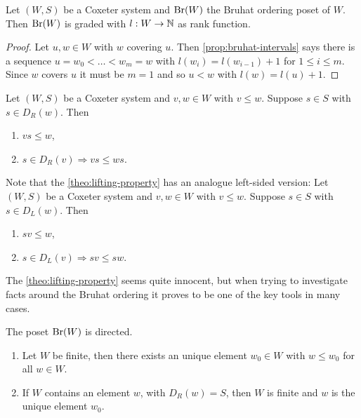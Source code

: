 \begin{coro}
	Let $(W,S)$ be a Coxeter system and $\operatorname{Br}(W)$ the Bruhat ordering poset of $W$. Then $\operatorname{Br}(W)$ is graded with $l:W \to \mathbb{N}$ as rank function.

	\begin{proof}
		Let $u,w \in W$ with $w$ covering $u$. Then \ref{prop:bruhat-intervals} says there is a sequence $u = w_0 < \ldots < w_m = w$ with $l(w_i) = l(w_{i-1}) + 1$ for $1 \leq i \leq m$. Since $w$ covers $u$ it must be $m = 1$ and so $u < w$ with $l(w) = l(u) + 1$.
	\end{proof}
\end{coro}

\begin{theo}
	Let $(W,S)$ be a Coxeter system and $v,w \in W$ with $v \leq w$. Suppose $s \in S$ with $s \in D_R(w)$. Then
	\begin{enumerate}
		\item $vs \leq w$,
		\item $s \in D_R(v) \Rightarrow vs \leq ws$.
	\end{enumerate}
\end{theo}

\begin{rema}
	Note that the \ref{theo:lifting-property} has an analogue left-sided version: Let $(W,S)$ be a Coxeter system and $v,w \in W$ with $v \leq w$. Suppose $s \in S$ with $s \in D_L(w)$. Then
	\begin{enumerate}
		\item $sv \leq w$,
		\item $s \in D_L(v) \Rightarrow sv \leq sw$.
	\end{enumerate}
\end{rema}

The \ref{theo:lifting-property} seems quite innocent, but when trying to investigate facts around the Bruhat ordering it proves to be one of the key tools in many cases.

\begin{prop}
	The poset $\operatorname{Br}(W)$ is directed.
\end{prop}

\begin{prop}
	\begin{enumerate}
		\item Let $W$ be finite, then there exists an unique element $w_0 \in W$ with $w \leq w_0$ for all $w \in W$.
		\item If $W$ contains an element $w$, with $D_R(w) = S$, then $W$ is finite and $w$ is the unique element $w_0$.
	\end{enumerate}
\end{prop}

